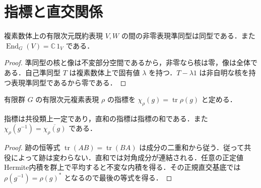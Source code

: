 \section{指標と直交関係}
\begin{prop}[Schurの補題]
複素数体上の有限次元既約表現 $V,W$ の間の非零表現準同型は同型である．また $\operatorname{End}_G(V)=\mathbb C\,1_V$ である．
\end{prop}
\begin{proof}
準同型の核と像は不変部分空間であるから，非零なら核は零，像は全体である．自己準同型 $T$ は複素数体上で固有値 $\lambda$ を持つ．$T-\lambda 1$ は非自明な核を持つ表現準同型であるから零である．
\end{proof}
\begin{defn}[複素指標]
有限群 $G$ の有限次元複素表現 $\rho$ の指標を $\chi_\rho(g)=\operatorname{tr}\rho(g)$ と定める．
\end{defn}
\begin{prop}[指標の基本性質]
指標は共役類上一定であり，直和の指標は指標の和である．また $\chi_\rho(g^{-1})=\overline{\chi_\rho(g)}$ である．
\end{prop}
\begin{proof}
跡の恒等式 $\operatorname{tr}(AB)=\operatorname{tr}(BA)$ は成分の二重和から従う．従って共役によって跡は変わらない．直和では対角成分が連結される．任意の正定値Hermite内積を群上で平均すると不変な内積を得る．その正規直交基底では $\rho(g^{-1})=\rho(g)^*$ となるので最後の等式を得る．
\end{proof}
